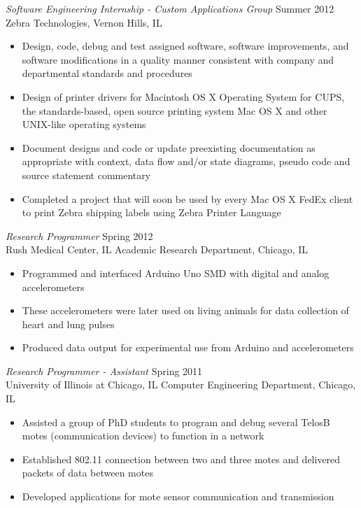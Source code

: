 \documentclass[margin]{res}
\begin{document}
\begin{resume}
{\sl Software Engineering Internship - Custom Applications Group} \hfill            Summer 2012\\
    Zebra Technologies, Vernon Hills, IL
	\begin{itemize}  \itemsep -2pt %
	\item Design, code, debug and test assigned software, software improvements, and software modifications in a quality manner consistent with company and departmental standards and procedures
	\item Design of printer drivers for Macintosh OS X Operating System for CUPS, the standards-based, open source printing system Mac OS X and other UNIX-like operating systems
	\item Document designs and code or update preexisting documentation as appropriate with context, data flow and/or state diagrams, pseudo code and source statement commentary
	\item Completed a project that will soon be used by every Mac OS X FedEx client to print Zebra shipping labels using Zebra Printer Language
	\end{itemize}
                 
{\sl Research Programmer } \hfill            Spring 2012\\
	Rush Medical Center, IL
	Academic Research Department, Chicago, IL
	\begin{itemize}  \itemsep -2pt %
	\item Programmed and interfaced Arduino Uno SMD with digital and analog accelerometers
	\item These accelerometers were later used on living animals for data collection of heart and lung pulses
	\item Produced data output for experimental use from Arduino and accelerometers
	\end{itemize}
                 
{\sl Research Programmer - Assistant } \hfill            Spring 2011\\
	University of Illinois at Chicago, IL
	Computer Engineering Department, Chicago, IL
	\begin{itemize}  \itemsep -2pt %
	\item Assisted a group of PhD students to program and debug several TelosB motes 			(communication devices) to function in a network
	\item Established 802.11 connection between two and three motes and delivered packets of 		data between motes
	\item Developed applications for mote sensor communication and transmission
	\end{itemize}   
            

\end{resume}
\end{document}
